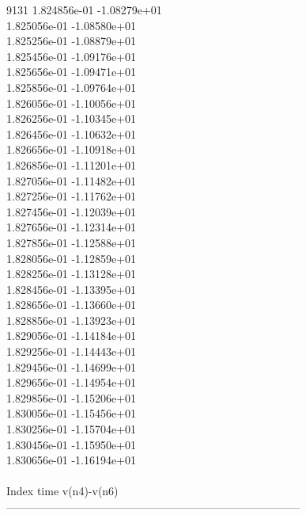 9131	1.824856e-01	-1.08279e+01	\\ 	1.825056e-01	-1.08580e+01	\\ 	1.825256e-01	-1.08879e+01	\\ 	1.825456e-01	-1.09176e+01	\\ 	1.825656e-01	-1.09471e+01	\\ 	1.825856e-01	-1.09764e+01	\\ 	1.826056e-01	-1.10056e+01	\\ 	1.826256e-01	-1.10345e+01	\\ 	1.826456e-01	-1.10632e+01	\\ 	1.826656e-01	-1.10918e+01	\\ 	1.826856e-01	-1.11201e+01	\\ 	1.827056e-01	-1.11482e+01	\\ 	1.827256e-01	-1.11762e+01	\\ 	1.827456e-01	-1.12039e+01	\\ 	1.827656e-01	-1.12314e+01	\\ 	1.827856e-01	-1.12588e+01	\\ 	1.828056e-01	-1.12859e+01	\\ 	1.828256e-01	-1.13128e+01	\\ 	1.828456e-01	-1.13395e+01	\\ 	1.828656e-01	-1.13660e+01	\\ 	1.828856e-01	-1.13923e+01	\\ 	1.829056e-01	-1.14184e+01	\\ 	1.829256e-01	-1.14443e+01	\\ 	1.829456e-01	-1.14699e+01	\\ 	1.829656e-01	-1.14954e+01	\\ 	1.829856e-01	-1.15206e+01	\\ 	1.830056e-01	-1.15456e+01	\\ 	1.830256e-01	-1.15704e+01	\\ 	1.830456e-01	-1.15950e+01	\\ 	1.830656e-01	-1.16194e+01	\\ \hline
\\ \hline
Index   time            v(n4)-v(n6)     \\ \hline
--------------------------------------------------------------------------------\\ \hline
